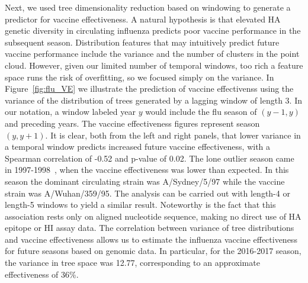 \documentclass[a4paper,11pt]{article}
\begin{document}
Next, we used tree dimensionality reduction based on windowing to generate a predictor for vaccine effectiveness.
A natural hypothesis is that elevated HA genetic diversity in circulating influenza predicts poor vaccine performance in the subsequent season.
Distribution features that may intuitively predict future vaccine performance include the variance and the number of clusters in the point cloud.
However, given our limited number of temporal windows, too rich a feature space runs the risk of overfitting, so we focused simply on the variance.
In Figure~\ref{fig:flu_VE} we illustrate the prediction of vaccine effectivenss using the variance of the distribution of trees generated by a lagging window of length 3.
In our notation, a window labeled year $y$ would include the flu season of $(y-1, y)$ and preceding years.
The vaccine effectiveness figures represent season $(y, y+1).$
It is clear, both from the left and right panels, that lower variance in a temporal window predicts increased future vaccine effectiveness, with a Spearman correlation of -0.52 and p-value of 0.02.
The lone outlier season came in 1997-1998~\cite{gupta2006quantifying}, when the vaccine effectiveness was lower than expected.
In this season the dominant circulating strain was A/Sydney/5/97 while the vaccine strain was A/Wuhan/359/95.
The analysis can be carried out with length-4 or length-5 windows to yield a similar result.
Noteworthy is the fact that this association rests only on aligned nucleotide sequence, making no direct use of HA epitope or HI assay data.
The correlation between variance of tree distributions and vaccine effectiveness allows us to estimate the influenza vaccine effectiveness for future seasons based on genomic data.
In particular, for the 2016-2017 season, the variance in tree space was 12.77, corresponding to an approximate effectiveness of 36\%.
\end{document}
